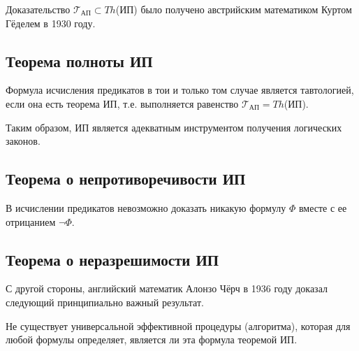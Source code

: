 Доказательство $\mathscr{T}_{\text{АП}}\subset Th$(ИП) было получено австрийским математиком Куртом Гёделем в 1930 году.
\subsection*{Теорема полноты ИП}
Формула исчисления предикатов в тои и только том случае является тавтологией, если она есть теорема ИП, т.е. выполняется равенство $\mathscr{T}_{\text{АП}} = Th$(ИП).

Таким образом, ИП является адекватным инструментом получения логических законов.

\subsection*{Теорема о непротиворечивости ИП}
В исчислении предикатов невозможно доказать никакую формулу $\Phi$ вместе с ее отрицанием $\lnot\Phi$.

\subsection*{Теорема о неразрешимости ИП}
С другой стороны, английский математик Алонзо Чёрч в 1936 году доказал следующий принципиально важный результат.

Не существует универсальной эффективной процедуры (алгоритма), которая для любой формулы определяет, является ли эта формула теоремой ИП.